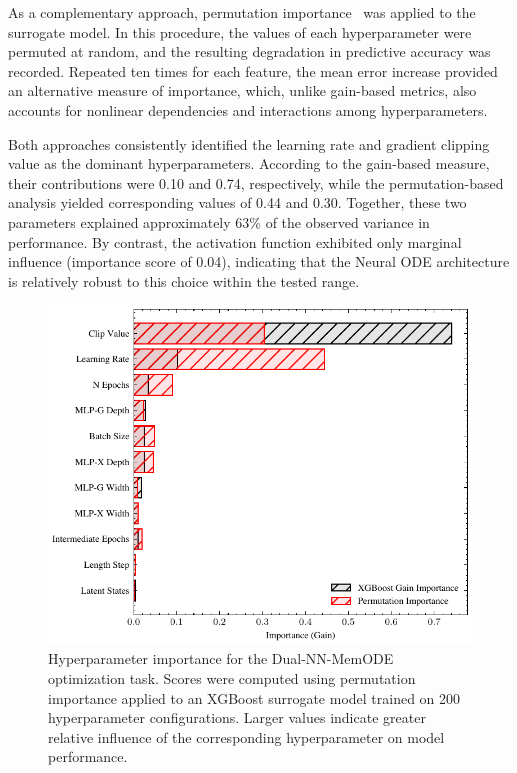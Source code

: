 \documentclass[lettersize,journal]{IEEEtran}
\begin{document}
As a complementary approach, permutation importance~\cite{Altmann2010} was applied to the surrogate model. In this procedure, the values of each hyperparameter were permuted at random, and the resulting degradation in predictive accuracy was recorded. Repeated ten times for each feature, the mean error increase provided an alternative measure of importance, which, unlike gain-based metrics, also accounts for nonlinear dependencies and interactions among hyperparameters.

Both approaches consistently identified the learning rate and gradient clipping value as the dominant hyperparameters. According to the gain-based measure, their contributions were 0.10 and 0.74, respectively, while the permutation-based analysis yielded corresponding values of 0.44 and 0.30. Together, these two parameters explained approximately 63\% of the observed variance in performance. By contrast, the activation function exhibited only marginal influence (importance score of 0.04), indicating that the Neural ODE architecture is relatively robust to this choice within the tested range.

\begin{figure}[!t]
  \centering
  \includegraphics[width=\linewidth]{mms_figs/xgboost_permutation_importance.pdf}
  \caption{Hyperparameter importance for the Dual-NN-MemODE optimization task. Scores were computed using permutation importance applied to an XGBoost surrogate model trained on 200 hyperparameter configurations. Larger values indicate greater relative influence of the corresponding hyperparameter on model performance.}
  \label{fig:hyperparameter_importance}
\end{figure}
\end{document}
